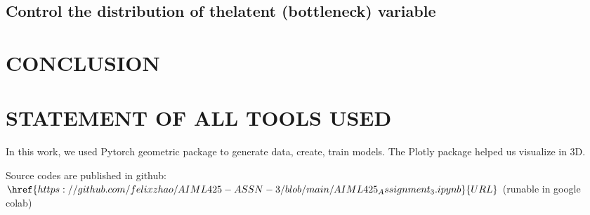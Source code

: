 \documentclass{article}
\begin{document}
\subsection{Control the distribution of thelatent (bottleneck) variable}
\label{ssec:VAE}


\section{CONCLUSION}
\label{sec:conclusion}


\section{STATEMENT OF ALL TOOLS USED}
\label{sec:statementofalltoolsused}

In this work, we used Pytorch geometric package to generate data, create, train models. 
The Plotly package helped us visualize in 3D. 

Source codes are published in github: 
$\href{https://github.com/felixzhao/AIML425-ASSN-3/blob/main/AIML425_Assignment_3.ipynb}{URL}$
 (runable in google colab)




\vfill\pagebreak



\end{document}
